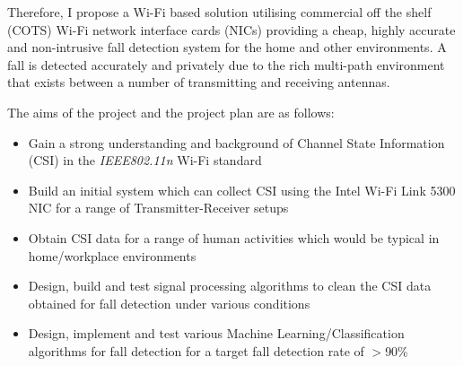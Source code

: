 Therefore, I propose a Wi-Fi based solution utilising commercial off the shelf (COTS) Wi-Fi network interface cards (NICs) providing a cheap, highly accurate and non-intrusive fall detection system for the home and other environments. A fall is detected accurately and privately due to the rich multi-path environment that exists between a number of transmitting and receiving antennas. \par
\begin{comment}Previous research papers have explored the use of the Channel State Information (CSI) of a WLAN Channel for fall detection.\end{comment} 
The aims of the project and the project plan are as follows: 
\vspace{-11pt}
\begin{itemize}[noitemsep, topsep=0pt]
\item Gain a strong understanding and background of Channel State Information (CSI) in the \textit{IEEE802.11n} Wi-Fi standard 
\item Build an initial system which can collect CSI using the Intel Wi-Fi Link 5300 NIC for a range of Transmitter-Receiver setups
\item Obtain CSI data for a range of human activities which would be typical in home/workplace environments
\item Design, build and test signal processing algorithms to clean the CSI data obtained for fall detection under various conditions
\item Design, implement and test various Machine Learning/Classification algorithms for fall detection for a target fall detection rate of $>$90\%
\end{itemize}

